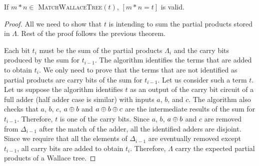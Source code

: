 \begin{thm}
  If $m*n\in$ \textsc{MatchWallaceTree}$(t)$, $[m*n = t]$ is valid.
\end{thm}
\begin{proof}
  All we need to show that $t$ is intending to sum the partial products
  stored in $\Lambda$. Rest of the proof follows the previous theorem.

  Each bit $t_i$ must be the sum of the partial products $\Lambda_i$ and 
  the carry bits produced by the sum for $t_{i-1}$.
  The algorithm identifies the terms that are added to obtain $t_i$.
  We only need to prove that the terms that are not identified as
  partial products are carry bits of the sum for $t_{i-1}$.
  Let us consider such a term $t$.
  Let us suppose the algorithm identifies $t$ as an output of the carry
  bit circuit of a full adder (half adder case is similar) with inputs
  $a$, $b$, and $c$.
  The algorithm also checks that $a$, $b$, $c$, $a \oplus b$ and
  $a \oplus b \oplus c$ are the intermediate
  results of the sum for $t_{i-1}$.
  Therefore, $t$ is one of the carry bits.
  Since $a$, $b$, $a \oplus b$ and $c$ are removed from $\Delta_{i-1}$
  after the match of the adder,
  all the identified adders are disjoint.
  Since we require that all the elements of $\Delta_{i-1}$  are eventually
  removed except $t_{i-1}$, all carry bits are added to obtain $t_i$.
  Therefore, $\Lambda$ carry the expected partial products of a Wallace tree.
\end{proof}


